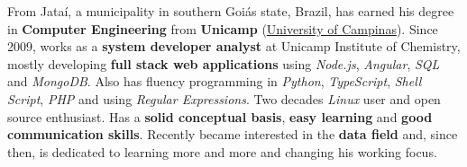 

\begin{cvparagraph}

From Jataí, a municipality in southern Goiás state, Brazil, has earned his degree in \textbf{Computer Engineering} from \textbf{Unicamp} (\href{https://en.wikipedia.org/wiki/University_of_Campinas}{University of Campinas}). Since 2009, works as a \textbf{system developer analyst} at Unicamp Institute of Chemistry, mostly developing \textbf{full stack web applications} using \textit{Node.js}, \textit{Angular}, \textit{SQL} and \textit{MongoDB}. Also has fluency programming in \textit{Python}, \textit{TypeScript}, \textit{Shell Script}, \textit{PHP} and using \textit{Regular Expressions}. Two decades \textit{Linux} user and open source enthusiast. Has a \textbf{solid conceptual basis}, \textbf{easy learning} and \textbf{good communication skills}. Recently became interested in the \textbf{data field} and, since then, is dedicated to learning more and more and changing his working focus.
\end{cvparagraph}
